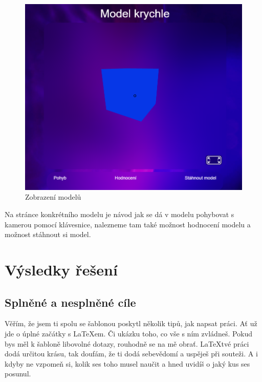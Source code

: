 \documentclass[12pt, a4paper,
twoside,        %
openright
]{report}
\begin{document}
\begin{figure}[h]
			\centering
			\includegraphics[width=0.5\linewidth]{image/model.png} 
			\caption{Zobrazení modelů}
		\end{figure}
		Na stránce konkrétního modelu je návod jak se dá v modelu pohybovat s kamerou pomocí klávesnice, nalezneme tam také možnost hodnocení modelu a možnost stáhnout si model.
\chapter{Výsledky řešení}
\section[Splněné a nesplněné cíle]{Splněné a nesplněné cíle}
Věřím, že jsem ti spolu se šablonou poskytl několik tipů, jak napsat práci. Ať už jde o úplné začátky s \LaTeX{}em. Či ukázku toho, co vše s ním zvládneš. Pokud bys měl k šabloně libovolné dotazy, rouhodně se na mě obrať. \LaTeX tvé práci dodá určitou krásu, tak doufám, že ti dodá sebevědomí a uspěješ při souteži. A i kdyby ne vzpomeň si, kolik ses toho musel naučit a hned uvidíš o jaký kus ses posunul.
\end{document}
